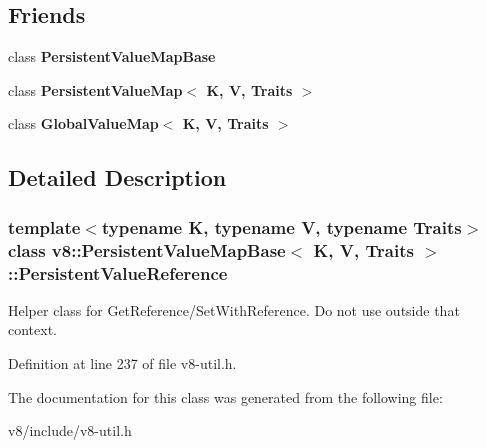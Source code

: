 \subsection*{Friends}
\begin{DoxyCompactItemize}
\item 
\mbox{\label{classv8_1_1PersistentValueMapBase_1_1PersistentValueReference_ae5cccd63ef6d94c509ad8b6970d4017d}} 
class {\bfseries Persistent\+Value\+Map\+Base}
\item 
\mbox{\label{classv8_1_1PersistentValueMapBase_1_1PersistentValueReference_a22fcaa9f3ba179f3bb566eda5b93790d}} 
class {\bfseries Persistent\+Value\+Map$<$ K, V, Traits $>$}
\item 
\mbox{\label{classv8_1_1PersistentValueMapBase_1_1PersistentValueReference_a41811cde55d1ef227d1ba28778d95d08}} 
class {\bfseries Global\+Value\+Map$<$ K, V, Traits $>$}
\end{DoxyCompactItemize}


\subsection{Detailed Description}
\subsubsection*{template$<$typename K, typename V, typename Traits$>$\newline
class v8\+::\+Persistent\+Value\+Map\+Base$<$ K, V, Traits $>$\+::\+Persistent\+Value\+Reference}

Helper class for Get\+Reference/\+Set\+With\+Reference. Do not use outside that context. 

Definition at line 237 of file v8-\/util.\+h.



The documentation for this class was generated from the following file\+:\begin{DoxyCompactItemize}
\item 
v8/include/v8-\/util.\+h\end{DoxyCompactItemize}
